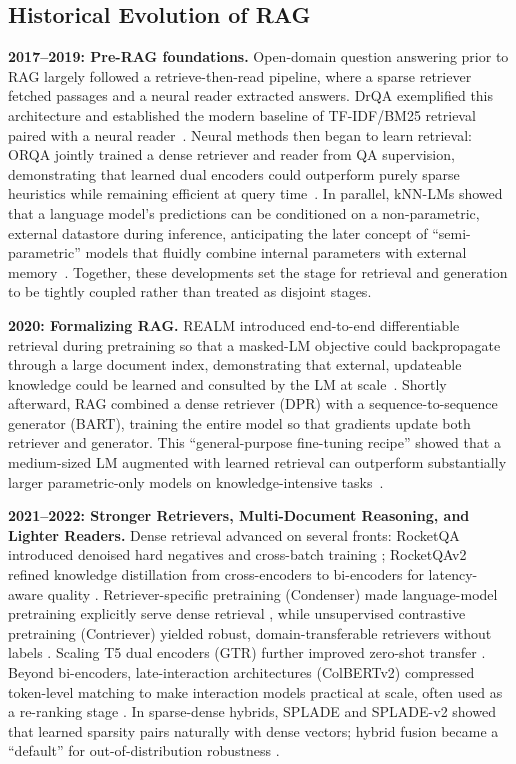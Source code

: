 \subsection{Historical Evolution of RAG}

\textbf{2017--2019: Pre-RAG foundations.}
Open-domain question answering prior to RAG largely followed a retrieve-then-read pipeline, where a sparse retriever fetched passages and a neural reader extracted answers. DrQA exemplified this architecture and established the modern baseline of TF-IDF/BM25 retrieval paired with a neural reader~\cite{chen2017drqa}. Neural methods then began to learn retrieval: ORQA jointly trained a dense retriever and reader from QA supervision, demonstrating that learned dual encoders could outperform purely sparse heuristics while remaining efficient at query time~\cite{orqa2019}. In parallel, kNN-LMs showed that a language model’s predictions can be conditioned on a non-parametric, external datastore during inference, anticipating the later concept of ``semi-parametric'' models that fluidly combine internal parameters with external memory~\cite{khandelwal2020knnlm}. Together, these developments set the stage for retrieval and generation to be tightly coupled rather than treated as disjoint stages.

\textbf{2020: Formalizing RAG.}
REALM introduced end-to-end differentiable retrieval during pretraining so that a masked-LM objective could backpropagate through a large document index, demonstrating that external, updateable knowledge could be learned and consulted by the LM at scale~\cite{realm2020}. Shortly afterward, RAG combined a dense retriever (DPR) with a sequence-to-sequence generator (BART), training the entire model so that gradients update both retriever and generator. This ``general-purpose fine-tuning recipe'' showed that a medium-sized LM augmented with learned retrieval can outperform substantially larger parametric-only models on knowledge-intensive tasks~\cite{lewis2020rag}.

\textbf{2021--2022: Stronger Retrievers, Multi-Document Reasoning, and Lighter Readers.}
Dense retrieval advanced on several fronts: RocketQA introduced denoised hard negatives and cross-batch training \cite{rocketqa2021}; RocketQAv2 refined knowledge distillation from cross-encoders to bi-encoders for latency-aware quality \cite{rocketqa2_2021}. Retriever-specific pretraining (Condenser) made language-model pretraining explicitly serve dense retrieval \cite{condenser2021}, while unsupervised contrastive pretraining (Contriever) yielded robust, domain-transferable retrievers without labels \cite{contriever2021}. Scaling T5 dual encoders (GTR) further improved zero-shot transfer \cite{gtr2021}. Beyond bi-encoders, late-interaction architectures (ColBERTv2) compressed token-level matching to make interaction models practical at scale, often used as a re-ranking stage \cite{colbertv2_2021}. In sparse-dense hybrids, SPLADE and SPLADE-v2 showed that learned sparsity pairs naturally with dense vectors; hybrid fusion became a ``default'' for out-of-distribution robustness \cite{splade2021, spladev2_2021}.

